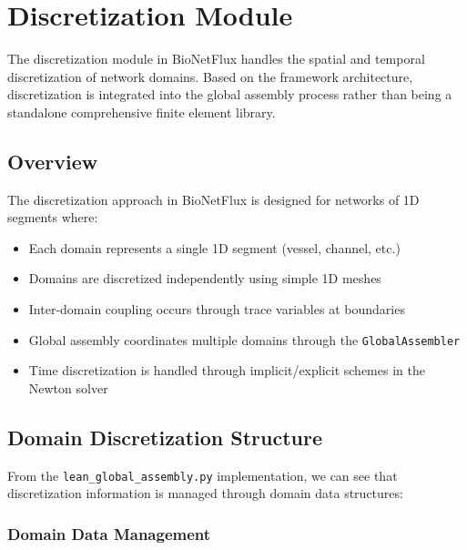 
\section{Discretization Module}
\label{sec:discretization_module}

The discretization module in BioNetFlux handles the spatial and temporal discretization of network domains. Based on the framework architecture, discretization is integrated into the global assembly process rather than being a standalone comprehensive finite element library.

\subsection{Overview}
\label{subsec:discretization_overview}

The discretization approach in BioNetFlux is designed for networks of 1D segments where:

\begin{itemize}
	\item Each domain represents a single 1D segment (vessel, channel, etc.)
	\item Domains are discretized independently using simple 1D meshes
	\item Inter-domain coupling occurs through trace variables at boundaries
	\item Global assembly coordinates multiple domains through the \texttt{GlobalAssembler}
	\item Time discretization is handled through implicit/explicit schemes in the Newton solver
\end{itemize}

\subsection{Domain Discretization Structure}
\label{subsec:domain_discretization}

From the \texttt{lean\_global\_assembly.py} implementation, we can see that discretization information is managed through domain data structures:

\subsubsection{Domain Data Management}

